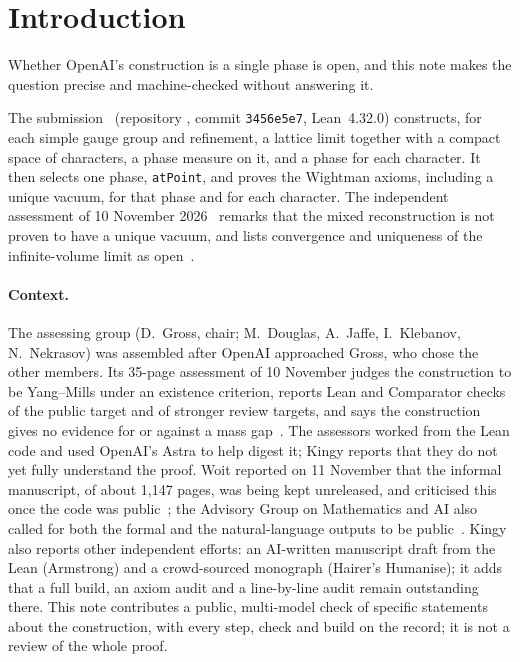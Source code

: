 \documentclass[11pt,a4paper]{article}
\newcommand{\lean}[1]{\texttt{#1}}
\theoremstyle{plain}
\begin{document}
\section{Introduction}\label{sec:intro}

Whether OpenAI's construction is a single phase is open, and this note makes the question precise and machine-checked without answering it.

The submission~\cite{OpenAI} (repository , commit \texttt{3456e5e7}, Lean~4.32.0) constructs, for each simple gauge group and refinement, a lattice limit together with a compact space of characters, a phase measure on it, and a phase for each character. It then selects one phase, \lean{atPoint}, and proves the Wightman axioms, including a unique vacuum, for that phase and for each character. The independent assessment of 10 November 2026~\cite[\S6.2]{YMgroup} remarks that the mixed reconstruction is not proven to have a unique vacuum, and lists convergence and uniqueness of the infinite-volume limit as open~\cite[\S8]{YMgroup}.

\paragraph{Context.} The assessing group (D.~Gross, chair; M.~Douglas, A.~Jaffe, I.~Klebanov, N.~Nekrasov) was assembled after OpenAI approached Gross, who chose the other members. Its 35-page assessment of 10 November judges the construction to be Yang--Mills under an existence criterion, reports Lean and Comparator checks of the public target and of stronger review targets, and says the construction gives no evidence for or against a mass gap~\cite{Kingy}. The assessors worked from the Lean code and used OpenAI's Astra to help digest it; Kingy reports that they do not yet fully understand the proof. Woit reported on 11 November that the informal manuscript, of about 1,147 pages, was being kept unreleased, and criticised this once the code was public~\cite{Woit}; the Advisory Group on Mathematics and AI also called for both the formal and the natural-language outputs to be public~\cite{Kingy}. Kingy also reports other independent efforts: an AI-written manuscript draft from the Lean (Armstrong) and a crowd-sourced monograph (Hairer's Humanise); it adds that a full build, an axiom audit and a line-by-line audit remain outstanding there. This note contributes a public, multi-model check of specific statements about the construction, with every step, check and build on the record; it is not a review of the whole proof.
\end{document}
